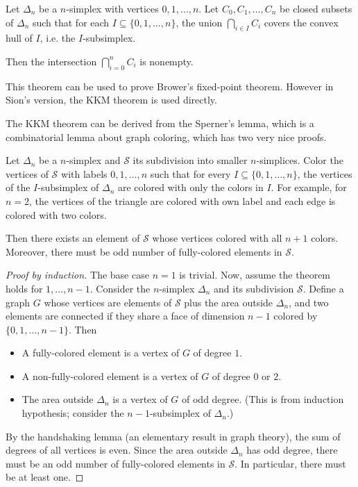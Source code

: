 \begin{theorem}
    Let $\Delta_n$ be a $n$-simplex with vertices $0, 1, \ldots, n$. Let $C_0, C_1, \ldots, C_n$ be closed subsets of $\Delta_n$ such that for each $I \subseteq \{0, 1, \ldots, n\}$, the union $\bigcap_{i \in I} C_i$ covers the convex hull of $I$, i.e. the $I$-subsimplex. 

    Then the intersection $\bigcap_{i=0}^n C_i$ is nonempty.
\end{theorem}

This theorem can be used to prove Brower's fixed-point theorem. However in Sion's version, the KKM theorem is used directly.

The KKM theorem can be derived from the Sperner's lemma, which is a combinatorial lemma about graph coloring, which has two very nice proofs.

\begin{theorem}
    Let $\Delta_n$ be a $n$-simplex and $\mathcal{S}$ its subdivision into smaller $n$-simplices. Color the vertices of $\mathcal{S}$ with labels $0, 1, \ldots, n$ such that for every $I \subseteq \{0, 1, \ldots, n\}$, the vertices of the $I$-subsimplex of $\Delta_n$ are colored with only the colors in $I$. For example, for $n=2$, the vertices of the triangle are colored with own label and each edge is colored with two colors.

    Then there exists an element of $\mathcal{S}$ whose vertices colored with all $n+1$ colors. Moreover, there must be odd number of fully-colored elements in $\mathcal{S}$.
\end{theorem}
\begin{proof}[Proof by induction]
    The base case $n = 1$ is trivial. Now, assume the theorem holds for $1, \ldots, n-1$. Consider the $n$-simplex $\Delta_n$ and its subdivision $\mathcal{S}$. Define a graph $G$ whose vertices are elements of $\mathcal{S}$ plus the area outside $\Delta_n$, and two elements are connected if they share a face of dimension $n-1$ colored by $\{ 0, 1, \ldots, n-1\}$. Then
    \begin{itemize}
        \item A fully-colored element is a vertex of $G$ of degree $1$.
        \item A non-fully-colored element is a vertex of $G$ of degree $0$ or $2$.
        \item The area outside $\Delta_n$ is a vertex of $G$ of odd degree. (This is from induction hypothesis; consider the $n-1$-subsimplex of $\Delta_n$.)
    \end{itemize}
    By the handshaking lemma (an elementary result in graph theory), the sum of degrees of all vertices is even. Since the area outside $\Delta_n$ has odd degree, there must be an odd number of fully-colored elements in $\mathcal{S}$. In particular, there must be at least one.
\end{proof}

